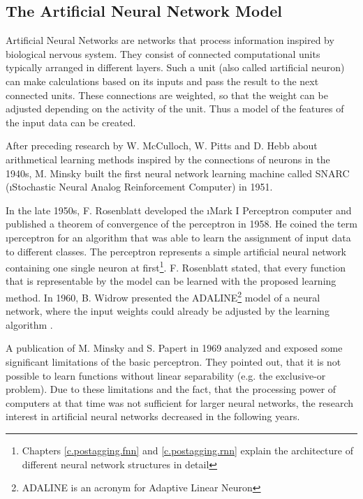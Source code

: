 \subsection{The Artificial Neural Network Model}\label{c.introduction.related.nn}
Artificial Neural Networks are networks that process information inspired by biological nervous system. They consist of connected computational units typically arranged in different layers. Such a unit (also called \i{artificial neuron}) can make calculations based on its inputs and pass the result to the next connected units. These connections are weighted, so that the weight can be adjusted depending on the activity of the unit. Thus a model of the features of the input data can be created.

After preceding research by W. McCulloch, W. Pitts \cite{mcculloch1943} and D. Hebb \cite{shaw1986} about arithmetical learning methods inspired by the connections of neurons in the 1940s, M. Minsky built the first neural network learning machine called SNARC (\i{Stochastic Neural Analog Reinforcement Computer)}\cite{crevier1993} in 1951.

In the late 1950s, F. Rosenblatt developed the \i{Mark I Perceptron} computer and published a theorem of convergence of the perceptron\cite{rosenblatt1958} in 1958. He coined the term \i{perceptron} for an algorithm that was able to learn the assignment of input data to different classes. The perceptron represents a simple artificial neural network containing one single neuron at first\footnote{Chapters \ref{c.postagging.fnn} and \ref{c.postagging.rnn} explain the architecture of different neural network structures in detail}. F. Rosenblatt stated, that every function that is representable by the model can be learned with the proposed learning method. In 1960, B. Widrow presented the ADALINE\footnote{ADALINE is an acronym for Adaptive Linear Neuron} model of a neural network, where the input weights could already be adjusted by the learning algorithm \cite{widrow1960}.

A publication of M. Minsky and S. Papert \cite{minsky1969} in 1969 analyzed and exposed some significant limitations of the basic perceptron. They pointed out, that it is not possible to learn functions without linear separability (e.g. the exclusive-or problem). Due to these limitations and the fact, that the processing power of computers at that time was not sufficient for larger neural networks, the research interest in artificial neural networks decreased in the following years.

